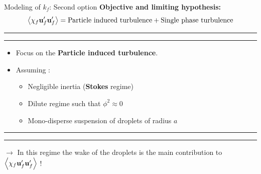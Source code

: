 \documentclass{sintefbeamer}
\begin{document}
\begin{frame}{Modeling of $k_f$: Second option}
  \textbf{Objective and limiting hypothesis:}
  \begin{equation*}
     \left<\chi_f \textbf{u}_f'\textbf{u}_f'\right>
     = 
     \text{Particle induced turbulence}
     + \text{Single phase turbulence}
  \end{equation*}
  \hrule\hrule
  \pause
  \begin{itemize}
    \item 
    Focus on the \textbf{Particle induced turbulence}. 
    \item Assuming : 
    \begin{itemize}
      \item Negligible inertia (\textbf{Stokes} regime)
      \item Dilute regime such that $\phi^{2} \approx 0$ 
      \item Mono-disperse suspension of droplets of radius $a$
    \end{itemize}
  \end{itemize}
\hrule\hrule
$\to$ In this regime the wake of the droplets is the main contribution to  $\left<\chi_f\textbf{u}_f'\textbf{u}_f'\right>$ !
\hfill
\end{frame}
\end{document}
